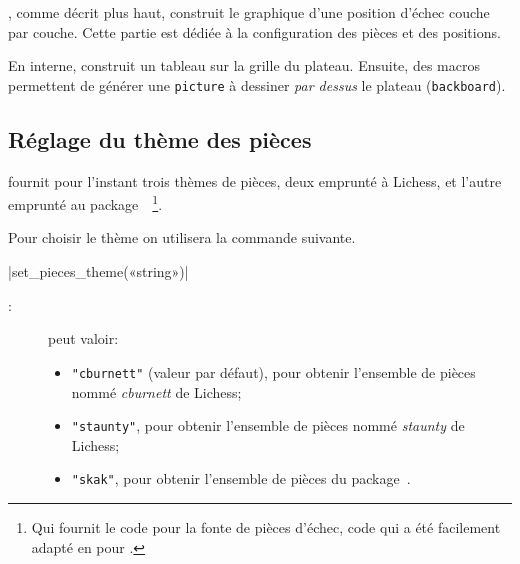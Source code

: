 \documentclass[french]{ltxdoc}
\begin{document}
\mpchess, comme décrit plus haut, construit le graphique d’une position d’échec
couche par couche. Cette partie est dédiée à la configuration des pièces et des
positions.

En interne, \mpchess construit un tableau sur la grille du plateau. Ensuite, des
macros permettent de générer une \lstinline+picture+ à dessiner \emph{par
  dessus} le plateau (\lstinline+backboard+).

\subsection{Réglage du thème des pièces}

\mpchess fournit pour l’instant trois thèmes de pièces, deux emprunté à Lichess,
et l’autre emprunté au package~~\cite{ctan-skak}\footnote{Qui
  fournit le code \MF{} pour la fonte de pièces d’échec, code qui a été
  facilement adapté en \MP{} pour \mpchess.}.

Pour choisir le thème on utilisera la commande suivante.

\commande|set_pieces_theme(«string»)|\smallskip

\begin{description}
  \item[:] peut valoir:
\begin{itemize}
\item \lstinline+"cburnett"+ (valeur par défaut), pour obtenir l’ensemble de pièces nommé \emph{cburnett} de Lichess;

\item \lstinline+"staunty"+, pour obtenir l’ensemble de pièces nommé \emph{staunty} de Lichess;
\item \lstinline+"skak"+, pour obtenir l’ensemble de pièces du package~.
\end{itemize}
\end{description}
\end{document}

